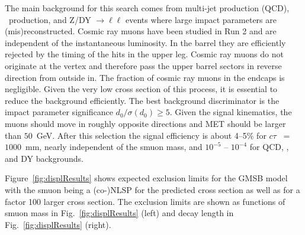 The main background for this search comes from multi-jet production (QCD), \ttbar~production, 
and Z/DY $\to\ell\ell$ events  where large impact parameters are (mis)reconstructed. 
Cosmic ray muons have been studied in Run 2 and are independent of the instantaneous luminosity.
In the barrel they are efficiently rejected by the timing of the hits in the upper leg. Cosmic ray muons do not originate at the vertex and therefore pass the upper barrel sectors in reverse 
direction from outside in. The fraction of cosmic ray muons in the endcaps is negligible. 
Given the very low cross section of this process, 
it is essential to reduce the background efficiently. The best background discriminator 
is the impact parameter significance $d_0 / \sigma (d_0) \geq 5$.
Given the signal kinematics, the muons should move in roughly opposite directions
and MET should be larger than $50$~GeV. 
After this selection the signal efficiency is about 4--5\% for $c\tau$~ = $1000$~mm, 
nearly independent of the smuon mass, 
and $10^{-5}$ -- $10^{-4}$ for QCD, \ttbar, and DY backgrounds.

Figure~\ref{fig:displResults} shows expected exclusion limits for the GMSB model with the smuon being a (co-)NLSP for the predicted cross section as well as for a factor 100 larger cross section. The exclusion limits are shown as functions of smuon mass in  Fig.~\ref{fig:displResults} (left) and decay length in Fig.~\ref{fig:displResults} (right).

